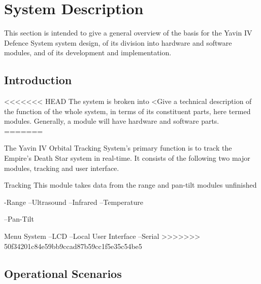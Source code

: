 \documentclass[]{report}
\begin{document}
\chapter{System Description}
This section is intended to give a general overview of the basis for the Yavin IV Defence System system design, of its division into hardware and software modules, and of its development and implementation.

\section{Introduction}
<<<<<<< HEAD
The system is broken into
<Give a technical description of the function of the whole system, in terms of its constituent parts, here termed modules. Generally, a module will have hardware and software parts.
=======

The Yavin IV Orbital Tracking System's primary function is to track the Empire's Death Star system in real-time. 
It consists of the following two major modules, tracking and user interface.


Tracking
This module takes data from the range and pan-tilt modules
unfinished

-Range
--Ultrasound 
--Infrared
--Temperature

--Pan-Tilt

Menu System
--LCD
--Local User Interface
--Serial
>>>>>>> 50f34201c84e59bb9ccad87b59cc1f5e35c54be5

\section{Operational Scenarios}
\end{document}
